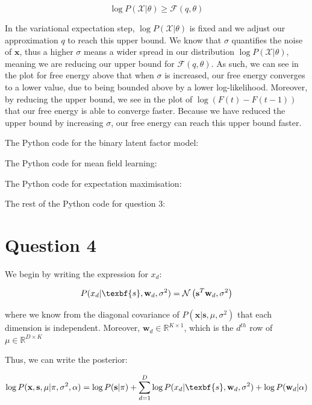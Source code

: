 \documentclass[12pt]{article}
\begin{document}
\[\log P(\mathcal{X} | \theta) \geq \mathcal{F}(q, \theta)\]

In the variational expectation step, $\log P(\mathcal{X} | \theta)$ is fixed and we adjust our approximation $q$ to reach this upper bound. We know that $\sigma$ quantifies the noise of $\textbf{x}$, thus a higher $\sigma$ means a wider spread in our distribution $\log P(\mathcal{X} | \theta)$, meaning we are reducing our upper bound for $\mathcal{F}(q, \theta)$. As such, we can see in the plot for free energy above that when $\sigma$ is increased, our free energy converges to a lower value, due to being bounded above by a lower log-likelihood. Moreover, by reducing the upper bound, we see in the plot of $\log(F(t)-F(t-1))$ that our free energy is able to converge faster. Because we have reduced the upper bound by increasing $\sigma$, our free energy can reach this upper bound faster.

\newpage
The Python code for the binary latent factor model:


\newpage
The Python code for mean field learning:


\newpage
The Python code for expectation maximisation:



\newpage
The rest of the Python code for question 3:

\newpage
\section*{Question 4}

We begin by writing the expression for $x_d$:

\[P(x_d | \texbf{s}, \textbf{w}_d, \sigma^2) = \mathcal{N}\left(\textbf{s}^T\textbf{w}_d, \sigma^2\right)\]

where we know from the diagonal covariance of $P(\textbf{x} | \textbf{s}, \mu, \sigma^2)$ that each dimension is independent. Moreover, $\textbf{w}_d \in \mathbb{R}^{K\times 1}$, which is the $d^{th}$ row of $\mu \in \mathbb{R}^{D \times K}$

Thus, we can write the posterior:

\[\log P(\textbf{x}, \textbf{s}, \mu| \pi , \sigma^2,  \alpha) = \log P( \textbf{s}| \pi) + \sum_{d=1}^{D} \log P(x_d | \texbf{s}, \textbf{w}_d, \sigma^2) + \log P( \textbf{w}_d| \alpha)
\]
\end{document}

